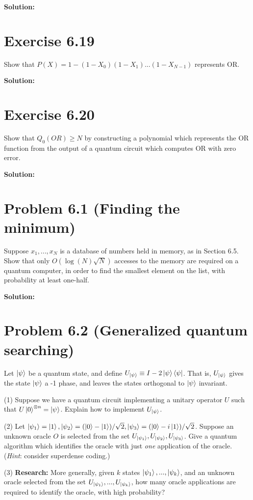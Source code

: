 \documentclass{book}
\begin{document}
        \textbf{Solution:}
    
    \section*{Exercise 6.19}
        Show that $P(X) = 1-(1-X_0)(1-X_1)...(1-X_{N-1})$ represents OR. 
        
        \textbf{Solution:}
    
    \section*{Exercise 6.20}
        Show that $Q_0(OR)\geq N$ by constructing a polynomial which represents the OR function from the output of a quantum circuit which computes OR with zero error.
        
        \textbf{Solution:}
    
    \section*{Problem 6.1 (Finding the minimum)}
        Suppose $x_1,...,x_N$ is a database of numbers held in memory, as in Section 6.5. Show that only $O(\log(N)\sqrt{N})$ accesses to the memory are required on a quantum computer, in order to find the smallest element on the list, with probability at least one-half. 
        
        \textbf{Solution:}
    
    \section*{Problem 6.2 (Generalized quantum searching)}
        Let $\ket{\psi}$ be a quantum state, and define $U_{\ket{\psi}}\equiv I - 2\ket{\psi}\bra{\psi}$. That is, $U_{\ket{\psi}}$ gives the state $\ket{\psi}$ a -1 phase, and leaves the states orthogonal to $\ket{\psi}$ invariant. \par
        
        (1) Suppose we have a quantum circuit implementing a unitary operator $U$ such that $U\ket{0}^{\otimes n} = \ket{\psi}$. Explain how to implement $U_{\ket{\psi}}$. \par
        (2) Let $\ket{\psi_1}=\ket{1}, \ket{\psi_2} = (\ket{0}-\ket{1})/\sqrt{2}, \ket{\psi_3}=(\ket{0}-i\ket{1})/\sqrt{2}$. Suppose an unknown oracle $O$ is selected from the set $U_{\ket{\psi_1}}, U_{\ket{\psi_2}}, U_{\ket{\psi_3}}$. Give a quantum algorithm which identifies the oracle with just \emph{one} application of the oracle. (\emph{Hint}: consider superdense coding.) \par
        (3) \textbf{Research:} More generally, given $k$ states $\ket{\psi_1},...,\ket{\psi_k}$, and an unknown oracle selected from the set $U_{\ket{\psi_1}},...,U_{\ket{\psi_k}}$, how many oracle applications are required to identify the oracle, with high probability?
        
\end{document}
